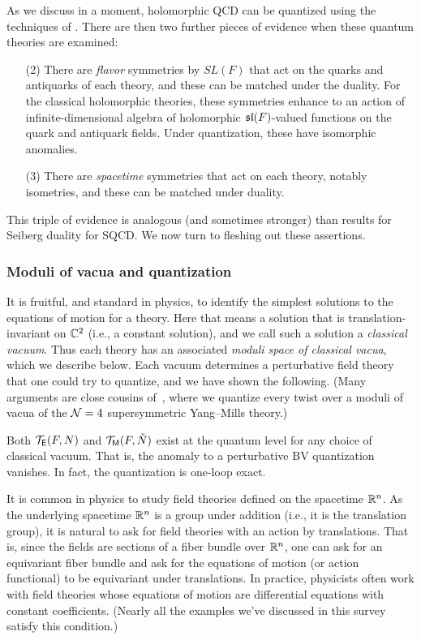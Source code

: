\documentclass[11pt]{amsart}
\begin{document}
As we discuss in a moment, holomorphic QCD can be quantized using the techniques of \cite{Whol}.
There are then two further pieces of evidence when these quantum theories are examined:
\begin{enumerate}
\item[(2)] There are {\em flavor} symmetries by $SL(F)$ that act on the quarks and antiquarks of each theory, 
and these can be matched under the duality. 
For the classical holomorphic theories, these symmetries enhance to an action of infinite-dimensional algebra of holomorphic $\sl(F)$-valued functions on the quark and antiquark fields.
Under quantization, these have isomorphic anomalies.
\item[(3)] There are {\em spacetime} symmetries that act on each theory, notably isometries, and these can be matched under duality.
\end{enumerate}
This triple of evidence is analogous (and sometimes stronger) than results for Seiberg duality for SQCD. 
We now turn to fleshing out these assertions.

\subsubsection{Moduli of vacua and quantization}

It is fruitful, and standard in physics, to identify the simplest solutions to the equations of motion for a theory.
Here that means a solution that is translation-invariant on $\CC^2$ (i.e., a constant solution),
and we call such a solution a {\em classical vacuum}.
Thus each theory has an associated {\em moduli space of classical vacua},
which we describe below.
Each vacuum determines a perturbative field theory that one could try to quantize,
and we have shown the following.
(Many arguments are close cousins of~\cite{EGW}, where we quantize every twist over a moduli of vacua of the $\cN=4$ supersymmetric Yang--Mills theory.)

\begin{thm}
Both $\cT_{\sfE}(F,N)$ and $\cT_{\sfM}(F, \check{N})$ exist at the quantum level for any choice of classical vacuum. 
That is, the anomaly to a perturbative BV quantization vanishes.
In fact, the quantization is one-loop exact. 
\end{thm}

It is common in physics to study field theories defined on the spacetime $\RR^n$.
As the underlying spacetime $\RR^n$ is a group under addition (i.e., it is the translation group),
it is natural to ask for field theories with an action by translations.
That is, since the fields are sections of a fiber bundle over $\RR^n$,
one can ask for an equivariant fiber bundle and ask for the equations of motion (or action functional) to be equivariant under translations.
In practice, physicists often work with field theories whose equations of motion are differential equations with constant coefficients.
(Nearly all the examples we've discussed in this survey satisfy this condition.)
\end{document}
